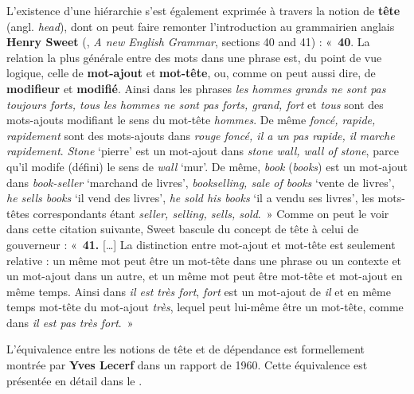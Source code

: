 {    L’existence d’une hiérarchie s’est également exprimée à travers la notion de \textbf{tête} (angl. \textit{head}), dont on peut faire remonter l’introduction au grammairien anglais \textbf{Henry Sweet} (\citeyear{sweet1891new}, \textit{A new English Grammar}, sections 40 and 41) : «~\textbf{40}. La relation la plus générale entre des mots dans une phrase est, du point de vue logique, celle de \textbf{mot-ajout} et \textbf{mot-tête}, ou, comme on peut aussi dire, de \textbf{modifieur} et \textbf{modifié}. Ainsi dans les phrases \textit{les hommes grands ne sont pas toujours forts, tous les hommes ne sont pas forts, grand, fort} et \textit{tous} sont des mots-ajouts modifiant le sens du mot-tête \textit{hommes}. De même \textit{foncé, rapide, rapidement} sont des mots-ajouts dans \textit{rouge foncé, il a un pas rapide, il marche rapidement}. \textit{Stone} ‘pierre’ est un mot-ajout dans \textit{stone wall, wall of stone}, parce qu’il modife (défini) le sens de \textit{wall} ‘mur’. De même, \textit{book} (\textit{books}) est un mot-ajout dans \textit{book-seller} ‘marchand de livres’, \textit{bookselling, sale of books} ‘vente de livres’, \textit{he sells books} ‘il vend des livres’, \textit{he sold his books} ‘il a vendu ses livres’, les mots-têtes correspondants étant \textit{seller, selling, sells, sold}.~» Comme on peut le voir dans cette citation suivante, Sweet bascule du concept de tête à celui de gouverneur : «~\textbf{41.} […] La distinction entre mot-ajout et mot-tête est seulement relative : un même mot peut être un mot-tête dans une phrase ou un contexte et un mot-ajout dans un autre, et un même mot peut être mot-tête et mot-ajout en même temps. Ainsi dans \textit{il est très fort}, \textit{fort} est un mot-ajout de \textit{il} et en même temps mot-tête du mot-ajout \textit{très}, lequel peut lui-même être un mot-tête, comme dans \textit{il est pas très fort}.~»

    L’équivalence entre les notions de tête et de dépendance est formellement montrée par \textbf{Yves Lecerf} dans un rapport de 1960. Cette équivalence est présentée en détail dans le .

}
